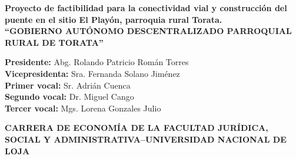 \newpage
\thispagestyle{metadatos}

\vspace*{0.2cm}

\begin{center}
  {\bfseries\fontsize{11pt}{14pt}\selectfont Proyecto de factibilidad para la conectividad vial y construcción del puente en el sitio El Playón, parroquia rural Torata.} \\[0.2cm]
  {\bfseries\fontsize{10.5pt}{13.5pt}\selectfont ``GOBIERNO AUTÓNOMO DESCENTRALIZADO PARROQUIAL RURAL DE TORATA''}
\end{center}

\vspace{0.4cm}

\noindent\hspace{1.2cm}\begin{minipage}{0.85\textwidth}
  \fontsize{10pt}{13pt}\selectfont
  \textbf{Presidente:} Abg. Rolando Patricio Román Torres \\
  \textbf{Vicepresidenta:} Sra. Fernanda Solano Jiménez \\
  \textbf{Primer vocal:} Sr. Adrián Cuenca \\
  \textbf{Segundo vocal:} Dr. Miguel Cango \\
  \textbf{Tercer vocal:} Mgs. Lorena Gonzales Julio
\end{minipage}

\vspace{0.6cm}

\begin{center}
  {\bfseries\fontsize{10.5pt}{13.5pt}\selectfont CARRERA DE ECONOMÍA DE LA FACULTAD JURÍDICA, SOCIAL Y ADMINISTRATIVA--UNIVERSIDAD NACIONAL DE LOJA}
\end{center}

\vspace{0.2cm}

